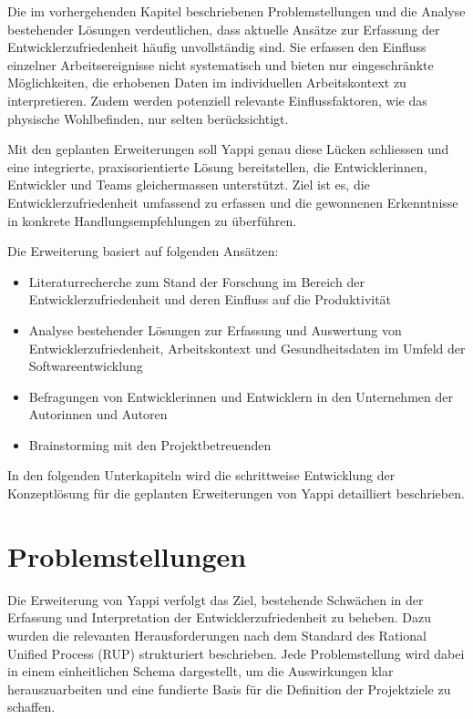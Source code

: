 \documentclass[12pt,a4paper]{report}
\begin{document}
Die im vorhergehenden Kapitel beschriebenen Problemstellungen und die Analyse bestehender Lösungen verdeutlichen, dass aktuelle
Ansätze zur Erfassung der Entwicklerzufriedenheit häufig unvollständig sind. Sie erfassen den Einfluss einzelner Arbeitsereignisse
nicht systematisch und bieten nur eingeschränkte Möglichkeiten, die erhobenen Daten im individuellen Arbeitskontext zu
interpretieren. Zudem werden potenziell relevante Einflussfaktoren, wie das physische Wohlbefinden, nur selten berücksichtigt.

Mit den geplanten Erweiterungen soll Yappi genau diese Lücken schliessen und eine integrierte, praxisorientierte Lösung
bereitstellen, die Entwicklerinnen, Entwickler und Teams gleichermassen unterstützt. Ziel ist es, die Entwicklerzufriedenheit 
umfassend zu erfassen und die gewonnenen Erkenntnisse in konkrete Handlungsempfehlungen zu überführen.

Die Erweiterung basiert auf folgenden Ansätzen:

\begin{itemize}
    \item Literaturrecherche zum Stand der Forschung im Bereich der Entwicklerzufriedenheit und deren Einfluss auf die
      Produktivität
    \item Analyse bestehender Lösungen zur Erfassung und Auswertung von Entwicklerzufriedenheit, Arbeitskontext und 
      Gesundheitsdaten im Umfeld der Softwareentwicklung
    \item Befragungen von Entwicklerinnen und Entwicklern in den Unternehmen der Autorinnen und Autoren
    \item Brainstorming mit den Projektbetreuenden
\end{itemize}

In den folgenden Unterkapiteln wird die schrittweise Entwicklung der Konzeptlösung für die geplanten Erweiterungen von Yappi
detailliert beschrieben.

\section{Problemstellungen}

Die Erweiterung von Yappi verfolgt das Ziel, bestehende Schwächen in der Erfassung und Interpretation der Entwicklerzufriedenheit
zu beheben. Dazu wurden die relevanten Herausforderungen nach dem Standard des Rational Unified Process (RUP) strukturiert
beschrieben. Jede Problemstellung wird dabei in einem einheitlichen Schema dargestellt, um die Auswirkungen klar herauszuarbeiten
und eine fundierte Basis für die Definition der Projektziele zu schaffen.
\end{document}
